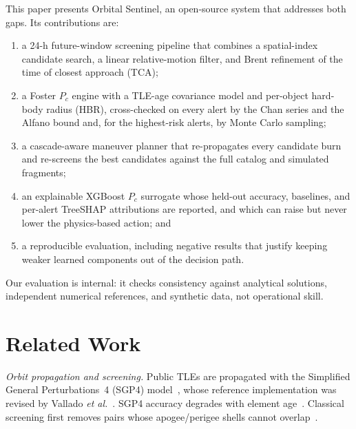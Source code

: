 \documentclass[conference]{IEEEtran}
\newcommand{\Pc}{P_c}
\begin{document}
This paper presents Orbital Sentinel, an open-source system that addresses both
gaps. Its contributions are:
\begin{enumerate}
  \item a 24-h future-window screening pipeline that combines a spatial-index
        candidate search, a linear relative-motion filter, and Brent refinement
        of the time of closest approach (TCA);
  \item a Foster $\Pc$ engine with a TLE-age covariance model and per-object
        hard-body radius (HBR), cross-checked on every alert by the Chan series
        and the Alfano bound and, for the highest-risk alerts, by Monte Carlo
        sampling;
  \item a cascade-aware maneuver planner that re-propagates every candidate
        burn and re-screens the best candidates against the full catalog and
        simulated fragments;
  \item an explainable XGBoost $\Pc$ surrogate whose held-out accuracy,
        baselines, and per-alert TreeSHAP attributions are reported, and which
        can raise but never lower the physics-based action; and
  \item a reproducible evaluation, including negative results that justify
        keeping weaker learned components out of the decision path.
\end{enumerate}
Our evaluation is internal: it checks consistency against analytical
solutions, independent numerical references, and synthetic data, not
operational skill.

\section{Related Work}
\label{sec:related}

\textit{Orbit propagation and screening.} Public TLEs are propagated with the
Simplified General Perturbations~4 (SGP4) model~\cite{hoots1980}, whose
reference implementation was revised by Vallado \textit{et
al.}~\cite{vallado2006}. SGP4 accuracy degrades with element
age~\cite{flohrer2008,vallado2012}. Classical screening first removes pairs
whose apogee/perigee shells cannot overlap~\cite{hoots1984}.
\end{document}
